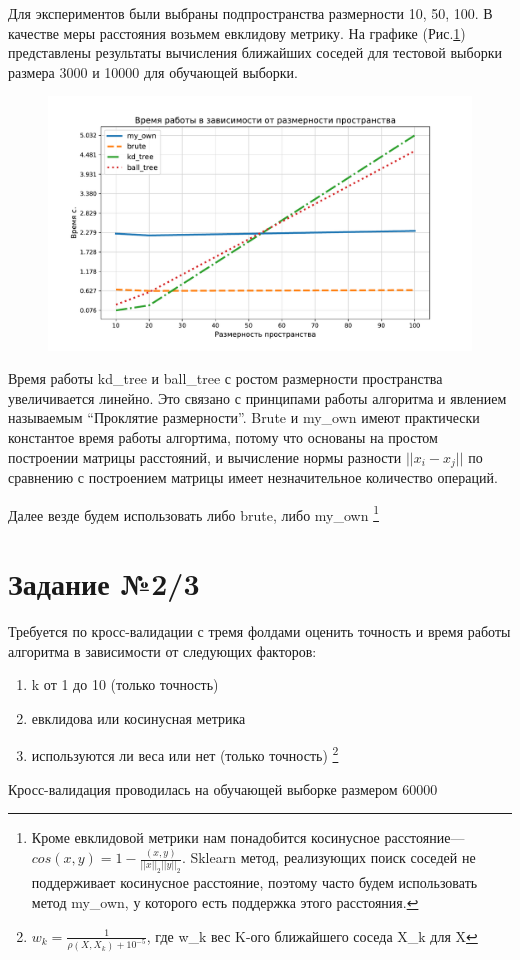 \documentclass[12pt,fleqn]{article}
\begin{document}
Для экспериментов были выбраны подпространства размерности 10, 50, 100.
В качестве меры расстояния возьмем евклидову метрику.
\newpage
На графике (Рис.\ref{pic1}) представлены результаты вычисления ближайших соседей для тестовой выборки размера 3000 и 10000
для обучающей выборки. 
\begin{figure}
    \centering
    \includegraphics[width=15cm]{task1.pdf} 
    \caption{}
    \label{pic1}
\end{figure}

Время работы kd\_tree и ball\_tree с ростом размерности пространства увеличивается линейно.
Это связано с принципами работы алгоритма и явлением называемым ``Проклятие размерности''.
Brute и my\_own имеют практически константое время работы алгортима, потому что основаны на простом построении матрицы 
расстояний, и вычисление нормы разности $||x_i-x_j||$  по сравнению с построением матрицы имеет
незначительное количество операций. 

Далее везде будем использовать либо brute, либо my\_own 
\footnote{Кроме евклидовой метрики нам понадобится косинусное расстояние---
$cos(x, y)=1- \frac{(x, y)}{||x||_2||y||_2}$.
Sklearn метод, реализующих поиск соседей не поддерживает косинусное расстояние,
поэтому часто будем использовать метод my\_own, у которого есть поддержка этого расстояния.}

\section{Задание №2/3}
Требуется по кросс-валидации с тремя фолдами оценить точность и время работы алгоритма в зависимости от следующих
факторов:
\begin{enumerate}
    \item k от 1 до 10 (только точность)
    \item евклидова или косинусная метрика
    \item используются ли веса или нет (только точность)
    \footnote{$w_k=\frac{1}{\rho(X,X_k)+10^{-5}}$, где w\_k вес K-ого ближайшего соседа X\_k для X}
\end{enumerate}
Кросс-валидация проводилась на обучающей выборке размером 60000
\newpage
\end{document}
